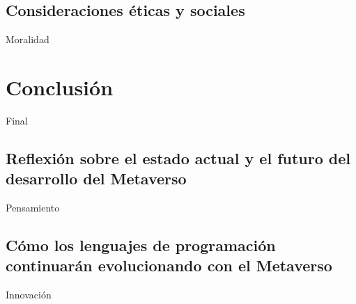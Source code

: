 \documentclass[a4paper,10pt]{article}
\begin{document}
	\subsection{Consideraciones éticas y sociales}
	Moralidad
	
	\section{Conclusión}
	Final
	\subsection{Reflexión sobre el estado actual y el futuro del desarrollo del Metaverso}
	Pensamiento
	\subsection{Cómo los lenguajes de programación continuarán evolucionando con el Metaverso}
	Innovación

	\printbibliography[heading=bibintoc]
\end{document}

